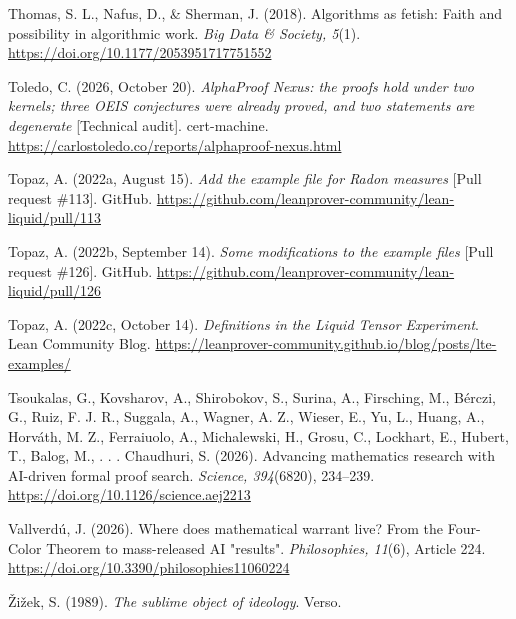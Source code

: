 \documentclass[pdflatex,sn-apa]{sn-jnl}
\begin{document}
\noindent\hangindent=0.5in Thomas, S. L., Nafus, D., \& Sherman, J. (2018). Algorithms as fetish: Faith and possibility in algorithmic work. \emph{Big Data \& Society, 5}(1). \url{https://doi.org/10.1177/2053951717751552}\par\medskip

\noindent\hangindent=0.5in Toledo, C. (2026, October 20). \emph{AlphaProof Nexus: the proofs hold under two kernels; three OEIS conjectures were already proved, and two statements are degenerate} [Technical audit]. cert-machine. \url{https://carlostoledo.co/reports/alphaproof-nexus.html}\par\medskip

\noindent\hangindent=0.5in Topaz, A. (2022a, August 15). \emph{Add the example file for Radon measures} [Pull request \#113]. GitHub. \url{https://github.com/leanprover-community/lean-liquid/pull/113}\par\medskip

\noindent\hangindent=0.5in Topaz, A. (2022b, September 14). \emph{Some modifications to the example files} [Pull request \#126]. GitHub. \url{https://github.com/leanprover-community/lean-liquid/pull/126}\par\medskip

\noindent\hangindent=0.5in Topaz, A. (2022c, October 14). \emph{Definitions in the Liquid Tensor Experiment}. Lean Community Blog. \url{https://leanprover-community.github.io/blog/posts/lte-examples/}\par\medskip

\noindent\hangindent=0.5in Tsoukalas, G., Kovsharov, A., Shirobokov, S., Surina, A., Firsching, M., Bérczi, G., Ruiz, F. J. R., Suggala, A., Wagner, A. Z., Wieser, E., Yu, L., Huang, A., Horváth, M. Z., Ferraiuolo, A., Michalewski, H., Grosu, C., Lockhart, E., Hubert, T., Balog, M., . . . Chaudhuri, S. (2026). Advancing mathematics research with AI-driven formal proof search. \emph{Science, 394}(6820), 234--239. \url{https://doi.org/10.1126/science.aej2213}\par\medskip

\noindent\hangindent=0.5in Vallverdú, J. (2026). Where does mathematical warrant live? From the Four-Color Theorem to mass-released AI "results". \emph{Philosophies, 11}(6), Article 224. \url{https://doi.org/10.3390/philosophies11060224}\par\medskip

\noindent\hangindent=0.5in Žižek, S. (1989). \emph{The sublime object of ideology}. Verso.\par\medskip
\end{document}
